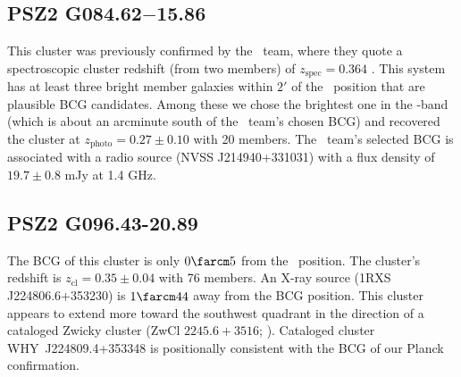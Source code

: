 \documentclass[apj, revtex4-1]{emulateapj}
\begin{document}
\subsection{PSZ2 G084.62$-$15.86} %
This cluster was previously confirmed by the \planck\ team, where they quote a spectroscopic cluster redshift (from two members) of $z_\mathrm{spec} = 0.364$ \citep{PlanckCollaboration2016a}. This system has at least three bright member galaxies within $2'$ of the \planck\ position that are plausible BCG candidates. Among these we chose the brightest one in the \sdssi-band (which is about an arcminute south of the \planck\ team's chosen BCG) and recovered the cluster at $z_\mathrm{photo} = 0.27 \pm 0.10$ with 20 members. The \planck\ team's selected BCG is associated with a radio source (NVSS J214940+331031) with a flux density of $19.7\pm 0.8$ mJy at 1.4 GHz.

\subsection{PSZ2 G096.43-20.89} %
The BCG of this cluster is only $0\farcm5$ from the \planck\ position. The cluster's redshift is $z_\mathrm{cl} = 0.35 \pm 0.04$ with 76 members. An X-ray source (1RXS J224806.6+353230) is $1\farcm44$ away from the BCG position. This cluster appears to extend more toward the southwest quadrant in the direction of a cataloged Zwicky cluster (ZwCl $2245.6+3516$; \citealt{Zwicky1968}). Cataloged cluster WHY~J224809.4+353348 is positionally consistent with the BCG of our Planck confirmation.
\end{document}
